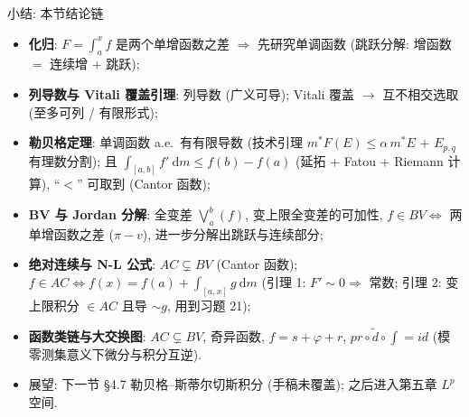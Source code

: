 \begin{frame}{小结: 本节结论链}

\begin{itemize}
\item \textbf{化归}: $F = \int_a^x f$ 是两个单增函数之差
  $\Rightarrow$ 先研究单调函数 (跳跃分解: 增函数 $=$ 连续增 $+$ 跳跃);
\item \textbf{列导数与 Vitali 覆盖引理}: 列导数 (广义可导);
  Vitali 覆盖 $\to$ 互不相交选取 (至多可列 / 有限形式);
\item \textbf{勒贝格定理}: 单调函数 a.e.\ 有有限导数
  (技术引理 $m^* F(E) \leqslant \alpha \, m^* E$ $+$ $E_{p, q}$ 有理数分割);
  且 $\int_{[a,b]} f' ~ \mathrm{d} m \leqslant f(b) - f(a)$
  (延拓 $+$ Fatou $+$ Riemann 计算), ``$<$'' 可取到 (Cantor 函数);
\item \textbf{BV 与 Jordan 分解}: 全变差 $\bigvee_a^b (f)$, 变上限全变差的可加性,
  $f \in BV \iff$ 两单增函数之差 ($\pi - v$), 进一步分解出跳跃与连续部分;
\item \textbf{绝对连续与 N-L 公式}: $AC \subsetneq BV$ (Cantor 函数);
  $f \in AC \iff f(x) = f(a) + \int_{[a,x]} g ~ \mathrm{d} m$
  (引理 1: $F' \sim 0 \Rightarrow$ 常数; 引理 2: 变上限积分 $\in AC$ 且导 $\sim g$,
  用到\alert{习题 21});
\item \textbf{函数类链与大交换图}: $AC \subsetneq BV$, 奇异函数, $f = s + \varphi + r$,
  $pr \circ \widetilde{d} \circ \int = id$ (模零测集意义下微分与积分互逆).
\end{itemize}

\pause

\begin{itemize}
\item 展望: 下一节 \S 4.7 勒贝格--斯蒂尔切斯积分 (手稿未覆盖);
  之后进入第五章 $L^p$ 空间.
\end{itemize}

\end{frame}





